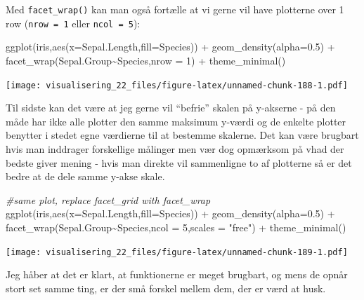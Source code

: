 \documentclass[
]{book}
\newenvironment{Shaded}{\begin{snugshade}}{\end{snugshade}}
\newcommand{\AttributeTok}[1]{\textcolor[rgb]{0.77,0.63,0.00}{#1}}
\newcommand{\CommentTok}[1]{\textcolor[rgb]{0.56,0.35,0.01}{\textit{#1}}}
\newcommand{\DecValTok}[1]{\textcolor[rgb]{0.00,0.00,0.81}{#1}}
\newcommand{\FloatTok}[1]{\textcolor[rgb]{0.00,0.00,0.81}{#1}}
\newcommand{\FunctionTok}[1]{\textcolor[rgb]{0.00,0.00,0.00}{#1}}
\newcommand{\NormalTok}[1]{#1}
\newcommand{\SpecialCharTok}[1]{\textcolor[rgb]{0.00,0.00,0.00}{#1}}
\newcommand{\StringTok}[1]{\textcolor[rgb]{0.31,0.60,0.02}{#1}}
\begin{document}
Med \texttt{facet\_wrap()} kan man også fortælle at vi gerne vil have plotterne over 1 row (\texttt{nrow\ =\ 1} eller \texttt{ncol\ =\ 5}):

\begin{Shaded}
\begin{Highlighting}[]
\FunctionTok{ggplot}\NormalTok{(iris,}\FunctionTok{aes}\NormalTok{(}\AttributeTok{x=}\NormalTok{Sepal.Length,}\AttributeTok{fill=}\NormalTok{Species)) }\SpecialCharTok{+} 
  \FunctionTok{geom\_density}\NormalTok{(}\AttributeTok{alpha=}\FloatTok{0.5}\NormalTok{) }\SpecialCharTok{+} 
  \FunctionTok{facet\_wrap}\NormalTok{(Sepal.Group}\SpecialCharTok{\textasciitilde{}}\NormalTok{Species,}\AttributeTok{nrow =} \DecValTok{1}\NormalTok{) }\SpecialCharTok{+} 
  \FunctionTok{theme\_minimal}\NormalTok{()}
\end{Highlighting}
\end{Shaded}

\texttt{[image: visualisering\_22\_files/figure-latex/unnamed-chunk-188-1.pdf]}

Til sidste kan det være at jeg gerne vil ``befrie'' skalen på y-akserne - på den måde har ikke alle plotter den samme maksimum y-værdi og de enkelte plotter benytter i stedet egne værdierne til at bestemme skalerne. Det kan være brugbart hvis man inddrager forskellige målinger men vær dog opmærksom på vhad der bedste giver mening - hvis man direkte vil sammenligne to af plotterne så er det bedre at de dele samme y-akse skale.

\begin{Shaded}
\begin{Highlighting}[]
\CommentTok{\#same plot, replace facet\_grid with facet\_wrap}
\FunctionTok{ggplot}\NormalTok{(iris,}\FunctionTok{aes}\NormalTok{(}\AttributeTok{x=}\NormalTok{Sepal.Length,}\AttributeTok{fill=}\NormalTok{Species)) }\SpecialCharTok{+} 
  \FunctionTok{geom\_density}\NormalTok{(}\AttributeTok{alpha=}\FloatTok{0.5}\NormalTok{) }\SpecialCharTok{+} 
  \FunctionTok{facet\_wrap}\NormalTok{(Sepal.Group}\SpecialCharTok{\textasciitilde{}}\NormalTok{Species,}\AttributeTok{ncol =} \DecValTok{5}\NormalTok{,}\AttributeTok{scales =} \StringTok{"free"}\NormalTok{) }\SpecialCharTok{+} 
  \FunctionTok{theme\_minimal}\NormalTok{()}
\end{Highlighting}
\end{Shaded}

\texttt{[image: visualisering\_22\_files/figure-latex/unnamed-chunk-189-1.pdf]}

Jeg håber at det er klart, at funktionerne er meget brugbart, og mens de opnår stort set samme ting, er der små forskel mellem dem, der er værd at husk.
\end{document}
